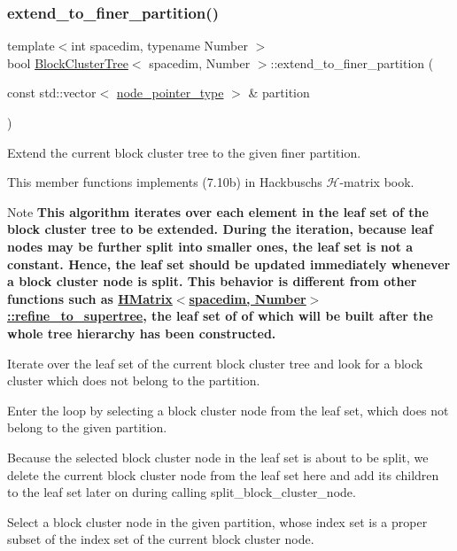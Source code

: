 \subsubsection{\texorpdfstring{extend\+\_\+to\+\_\+finer\+\_\+partition()}{extend\_to\_finer\_partition()}}
{\footnotesize\ttfamily template$<$int spacedim, typename Number $>$ \\
bool \hyperlink{classBlockClusterTree}{Block\+Cluster\+Tree}$<$ spacedim, Number $>$\+::extend\+\_\+to\+\_\+finer\+\_\+partition (\begin{DoxyParamCaption}\item[{const std\+::vector$<$ \hyperlink{classTreeNode}{node\+\_\+pointer\+\_\+type} $>$ \&}]{partition }\end{DoxyParamCaption})}

Extend the current block cluster tree to the given finer partition.

This member functions implements (7.\+10b) in Hackbusch\textquotesingle{}s $\mathcal{H}$-\/matrix book.


\begin{DoxyDescription}
\item[Note ]{\bfseries This algorithm iterates over each element in the leaf set of the block cluster tree to be extended. During the iteration, because leaf nodes may be further split into smaller ones, the leaf set is not a constant. Hence, the leaf set should be updated immediately whenever a block cluster node is split. This behavior is different from other functions such as {\ttfamily \hyperlink{classHMatrix_ad2b353962226c78910d6ddb6b5b8e460}{H\+Matrix$<$spacedim, Number$>$\+::refine\+\_\+to\+\_\+supertree}}, the leaf set of of which will be built after the whole tree hierarchy has been constructed.}  
\end{DoxyDescription}Iterate over the leaf set of the current block cluster tree and look for a block cluster which does not belong to the partition.

Enter the loop by selecting a block cluster node from the leaf set, which does not belong to the given partition.

Because the selected block cluster node in the leaf set is about to be split, we delete the current block cluster node from the leaf set here and add its children to the leaf set later on during calling {\ttfamily split\+\_\+block\+\_\+cluster\+\_\+node}.

Select a block cluster node in the given partition, whose index set is a proper subset of the index set of the current block cluster node.

